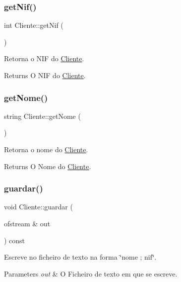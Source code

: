 \subsubsection{\texorpdfstring{get\+Nif()}{getNif()}}
{\footnotesize\ttfamily int Cliente\+::get\+Nif (\begin{DoxyParamCaption}{ }\end{DoxyParamCaption})}



Retorna o N\+IF do \hyperlink{class_cliente}{Cliente}. 

\begin{DoxyReturn}{Returns}
O N\+IF do \hyperlink{class_cliente}{Cliente}. 
\end{DoxyReturn}
\hypertarget{class_cliente_ac9662059b96002d423e33cb6827b37f1}{}\label{class_cliente_ac9662059b96002d423e33cb6827b37f1} 
\subsubsection{\texorpdfstring{get\+Nome()}{getNome()}}
{\footnotesize\ttfamily string Cliente\+::get\+Nome (\begin{DoxyParamCaption}{ }\end{DoxyParamCaption})}



Retorna o nome do \hyperlink{class_cliente}{Cliente}. 

\begin{DoxyReturn}{Returns}
O Nome do \hyperlink{class_cliente}{Cliente}. 
\end{DoxyReturn}
\hypertarget{class_cliente_ad1f4557a02cedb762de957cb18e97dd5}{}\label{class_cliente_ad1f4557a02cedb762de957cb18e97dd5} 
\subsubsection{\texorpdfstring{guardar()}{guardar()}}
{\footnotesize\ttfamily void Cliente\+::guardar (\begin{DoxyParamCaption}\item[{ofstream \&}]{out }\end{DoxyParamCaption}) const}



Escreve no ficheiro de texto na forma \char`\"{}nome ; nif\char`\"{}. 


\begin{DoxyParams}{Parameters}
{\em out} & O Ficheiro de texto em que se escreve. \\
\hline
\end{DoxyParams}
\hypertarget{class_cliente_a093309873c9b1514786650e03a50247e}{}\label{class_cliente_a093309873c9b1514786650e03a50247e} 
